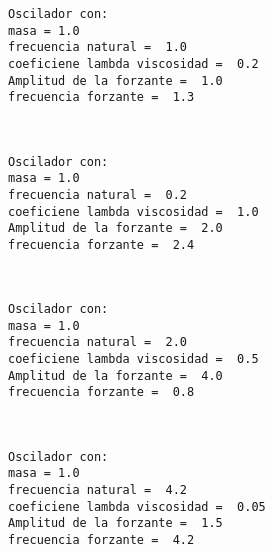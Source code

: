 \documentclass[11pt]{article}
\begin{document}
    \begin{Verbatim}[commandchars=\\\{\}]
Oscilador con:
masa = 1.0
frecuencia natural =  1.0
coeficiene lambda viscosidad =  0.2
Amplitud de la forzante =  1.0
frecuencia forzante =  1.3

    \end{Verbatim}

    \begin{center}
    \end{center}
    { \hspace*{\fill} \\}
    
    \begin{Verbatim}[commandchars=\\\{\}]
Oscilador con:
masa = 1.0
frecuencia natural =  0.2
coeficiene lambda viscosidad =  1.0
Amplitud de la forzante =  2.0
frecuencia forzante =  2.4

    \end{Verbatim}

    \begin{center}
    \end{center}
    { \hspace*{\fill} \\}
    
    \begin{Verbatim}[commandchars=\\\{\}]
Oscilador con:
masa = 1.0
frecuencia natural =  2.0
coeficiene lambda viscosidad =  0.5
Amplitud de la forzante =  4.0
frecuencia forzante =  0.8

    \end{Verbatim}

    \begin{center}
    \end{center}
    { \hspace*{\fill} \\}
    
    \begin{Verbatim}[commandchars=\\\{\}]
Oscilador con:
masa = 1.0
frecuencia natural =  4.2
coeficiene lambda viscosidad =  0.05
Amplitud de la forzante =  1.5
frecuencia forzante =  4.2

    \end{Verbatim}
\end{document}
